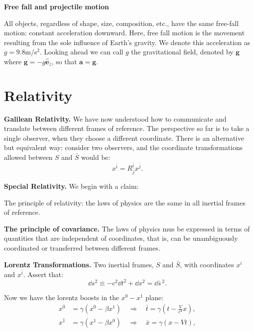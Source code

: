 \documentclass[10pt]{article}
\begin{document}
	\vspace{2\baselineskip}
	\textbf{Free fall and projectile motion}
	\begin{claim}
		All objects, regardless of shape, size, composition, etc., have the same free-fall motion: constant acceleration downward. Here, free fall motion is the movement resulting from the sole influence of Earth's gravity. We denote this acceleration as $g = 9.8$m/s$^{2}$. Looking ahead we can call $g$ the gravitational field, denoted by $\mathbf{g}$ where $\mathbf{g} = -g\hat{\mathbf{e}}_z$, so that $\mathbf{a} = \mathbf{g}$.
	\end{claim}

	\section{Relativity}
	\textbf{Galilean Relativity.} We have now understood how to communicate and translate between different frames of reference. The perspective so far is to take a single observer, when they choose a different coordinate. There is an alternative but equivalent way: consider two observers, and the coordinate transformations allowed between $S$ and $\bar{S}$ would be:
	\begin{equation}
	  x^{\bar{i}} = R^{\bar{i}}_{\bar{j}}x^{\bar{j}}.
	\end{equation}

	\textbf{Special Relativity.} We begin with a claim:
	\begin{claim}
		The principle of relativity: the laws of physics are the same in all inertial frames of reference.

		\vspace{2\baselineskip}
		\textbf{The principle of covariance.} The laws of physics mus be expressed in terms of quantities that are independent of coordinates, that is, can be unambiguously coordinated or transferred between different frames. 
	\end{claim}

	\textbf{Lorentz Transformations.} Two inertial frames, $S$ and $\bar{S}$, with coordinates $x^{i}$ and $x^{\bar{i}}$. Assert that:
	\begin{equation}
	  \dd s^{2} \equiv -c^{2} \dd t^{2} + \dd x^{2} = \dd \bar{s}\,^{2}.
	\end{equation}

	Now we have the lorentz boosts in the $x^{0}-x^{1}$ plane:
	\begin{equation}
	  \begin{aligned}
	  x^{\bar{0}} &= \gamma \left( x^{0} - \beta x^{1} \right) \quad \Rightarrow \quad \bar{t} = \gamma \left( t - \frac{V}{c^{2}} x \right),  \\
	  x^{\bar{1}} &= \gamma \left( x^{1} - \beta x^{0} \right) \quad \Rightarrow \quad \bar{x} = \gamma \left( x - Vt \right),
	  \end{aligned}
	\end{equation}
\end{document}

